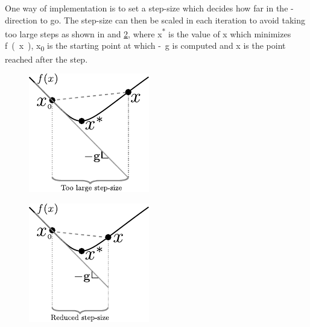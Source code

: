 One way of implementation is to set a step-size which decides how far in the \si{-} direction to go. The step-size can then be scaled in each iteration to avoid taking too large steps as shown in  and \ref{SteepestDescendSmallStep}, where \si{x^*} is the value of \si{x} which minimizes \si{f(x)}, \si{x_0} is the starting point at which \si{-g} is computed and \si{x} is the point reached after the step.
%
\begin{minipage}{\linewidth}
	\begin{minipage}{0.45\linewidth}
		\begin{figure}[H]
			\includegraphics[scale=1.4]{figures/gradientDescendLargeStep2}
			\centering
			\captionsetup{justification=centering}
			\label{SteepestDescendLargeStep}
		\end{figure}
	\end{minipage}
	\hspace{0.03\linewidth}
	\begin{minipage}{0.45\linewidth}
		\begin{figure}[H]
			\includegraphics[scale=1.44]{figures/gradientDescendReducedStep2}
			\centering
			\captionsetup{justification=centering}
			\label{SteepestDescendSmallStep}
		\end{figure}
	\end{minipage}
\end{minipage}


